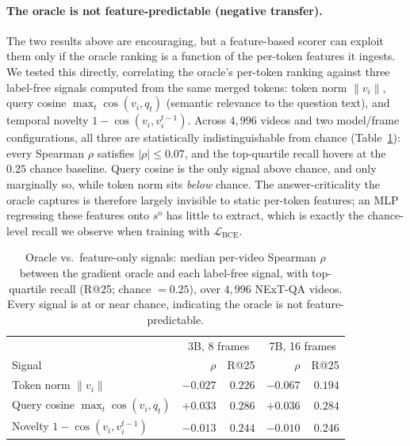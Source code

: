 \documentclass[12pt]{article}
\begin{document}
\paragraph{The oracle is not feature-predictable (negative transfer).}
The two results above are encouraging, but a feature-based scorer can
exploit them only if the oracle ranking is a function of the per-token
features it ingests. We tested this directly, correlating the oracle's
per-token ranking against three label-free signals computed from the same
merged tokens: token norm $\lVert v_i \rVert$, query cosine $\max_t
\cos(v_i, q_t)$ (semantic relevance to the question text), and temporal
novelty $1 - \cos(v_i, v_i^{t-1})$. Across $4{,}996$ videos and two
model/frame configurations, all three are statistically indistinguishable
from chance (Table~\ref{tab:oracle-corr}): every Spearman $\rho$ satisfies
$|\rho| \le 0.07$, and the top-quartile recall hovers at the $0.25$ chance
baseline. Query cosine is the only signal above chance, and only
marginally so, while token norm sits \emph{below} chance. The
answer-criticality the oracle captures is therefore largely invisible to
static per-token features; an MLP regressing these features onto
$s^{\text{o}}$ has little to extract, which is exactly the chance-level
recall we observe when training with $\mathcal{L}_{\text{BCE}}$.

\begin{table}[h]
\centering
\begin{tabular}{l r r r r}
\hline
 & \multicolumn{2}{c}{3B, 8 frames} & \multicolumn{2}{c}{7B, 16 frames} \\
Signal & $\rho$ & R@25 & $\rho$ & R@25 \\
\hline
Token norm $\lVert v_i \rVert$              & $-0.027$ & $0.226$ & $-0.067$ & $0.194$ \\
Query cosine $\max_t \cos(v_i, q_t)$        & $+0.033$ & $0.286$ & $+0.036$ & $0.284$ \\
Novelty $1 - \cos(v_i, v_i^{t-1})$          & $-0.013$ & $0.244$ & $-0.010$ & $0.246$ \\
\hline
\end{tabular}
\caption{Oracle vs.\ feature-only signals: median per-video Spearman
$\rho$ between the gradient oracle and each label-free signal, with
top-quartile recall (R@25; chance $= 0.25$), over $4{,}996$ NExT-QA
videos. Every signal is at or near chance, indicating the oracle is not
feature-predictable.}
\label{tab:oracle-corr}
\end{table}
\end{document}
